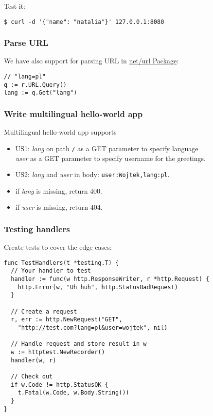 \documentclass[11pt, letterpaper]{article}
\begin{document}
Test it:

\begin{verbatim}
$ curl -d '{"name": "natalia"}' 127.0.0.1:8080 
\end{verbatim}


\subsubsection{Parse URL}

We have also support for parsing URL in \href{https://golang.org/pkg/net/url/}{net/url Package}:

\begin{verbatim}
// "lang=pl"
q := r.URL.Query()
lang := q.Get("lang")
\end{verbatim}

\subsubsection{Write multilingual hello-world app}

Multilingual hello-world app supports 

\begin{itemize}
\item US1: \emph{lang} on path \verb|/| as a GET parameter to specify language \\
       \emph{user} as a GET parameter to specify username for the greetings.
\item US2: \emph{lang} and  \emph{user} in body: \verb|user:Wojtek,lang:pl|.
\item if \emph{lang} is missing, return 400.
\item if \emph{user} is missing, return 404.
\end{itemize}

\subsubsection{Testing handlers}

Create tests to cover the edge cases:

\begin{verbatim}
func TestHandlers(t *testing.T) {
  // Your handler to test
  handler := func(w http.ResponseWriter, r *http.Request) {
    http.Error(w, "Uh huh", http.StatusBadRequest)
  }

  // Create a request
  r, err := http.NewRequest("GET",
    "http://test.com?lang=pl&user=wojtek", nil)

  // Handle request and store result in w
  w := httptest.NewRecorder()
  handler(w, r)

  // Check out
  if w.Code != http.StatusOK {
    t.Fatal(w.Code, w.Body.String())
  }
}
\end{verbatim}
\end{document}
